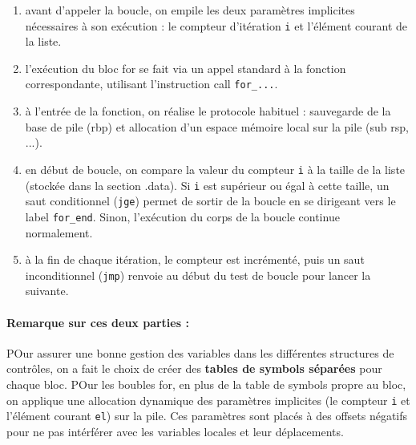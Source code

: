 \documentclass[a4paper, 12pt]{report}
\begin{document}
\begin{enumerate}
	\item avant d’appeler la boucle, on empile les deux paramètres implicites nécessaires à son exécution : le compteur d’itération \texttt{i} et l’élément courant de la liste.

	\item l’exécution du bloc for se fait via un appel standard à la fonction correspondante, utilisant l’instruction call \texttt{for\_...}.
	\item à l’entrée de la fonction, on réalise le protocole habituel : sauvegarde de la base de pile (rbp) et allocation d’un espace mémoire local sur la pile (sub rsp, ...).
	\item en début de boucle, on compare la valeur du compteur \texttt{i} à la taille de la liste (stockée dans la section .data). Si \texttt{i} est supérieur ou égal à cette taille, un saut conditionnel (\texttt{jge}) permet de sortir de la boucle en se dirigeant vers le label \texttt{for\_end}. Sinon, l’exécution du corps de la boucle continue normalement.
	\item à la fin de chaque itération, le compteur est incrémenté, puis un saut inconditionnel (\texttt{jmp}) renvoie au début du test de boucle pour lancer la suivante.
\end{enumerate}

\paragraph*{Remarque sur ces deux parties :} POur assurer une bonne gestion des variables dans les différentes structures de contrôles, on a fait le choix de créer des \textbf{tables de symbols séparées} pour chaque bloc. POur les boubles for, en plus de la table de symbols propre au bloc, on applique une allocation dynamique des paramètres implicites (le compteur \texttt{i} et l'élément courant \texttt{el}) sur la pile. Ces paramètres sont placés à des offsets négatifs pour ne pas intérférer avec les variables locales et leur déplacements.

%
\end{document}

